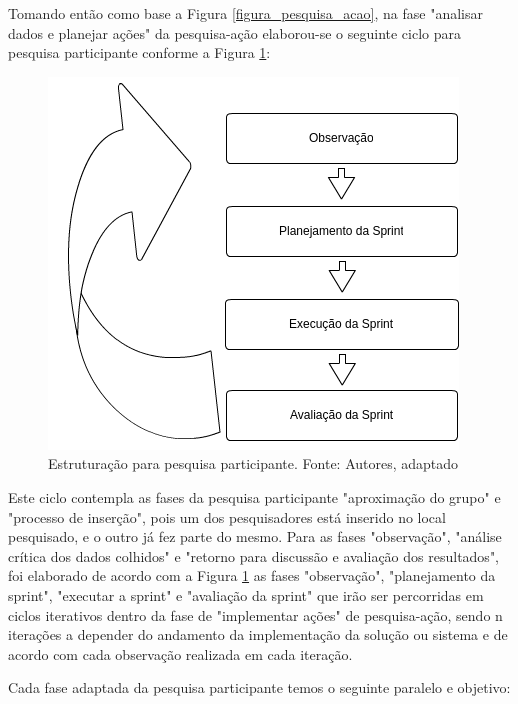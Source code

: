 Tomando então como base a Figura \ref{figura_pesquisa_acao}, na fase "analisar dados e planejar ações" da pesquisa-ação elaborou-se o seguinte ciclo para pesquisa participante conforme a Figura \ref{figura_pesquisa_participante}:

\begin{figure}[!htb]
	\centering
	\includegraphics[scale=0.6]{figuras/Fases_pesquisa_participante}
	\caption{Estruturação para pesquisa participante. Fonte: Autores, adaptado}
	\label{figura_pesquisa_participante}
\end{figure}

Este ciclo contempla as fases da pesquisa participante "aproximação do grupo" e "processo de inserção", pois um dos pesquisadores está inserido no local pesquisado, e o outro já fez parte do mesmo. Para as fases "observação", "análise crítica dos dados colhidos" e "retorno para discussão e avaliação dos resultados", foi elaborado de acordo com a Figura \ref{figura_pesquisa_participante} as fases "observação", "planejamento da sprint", "executar a sprint" e "avaliação da sprint" que irão ser percorridas em ciclos iterativos dentro da fase de "implementar ações" de pesquisa-ação, sendo n iterações a depender do andamento da implementação da solução ou sistema e de acordo com cada observação realizada em cada iteração.

Cada fase adaptada da pesquisa participante temos o seguinte paralelo e objetivo:

